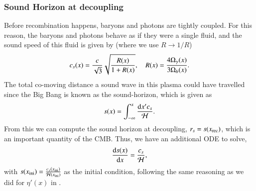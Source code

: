 \subsubsection{Sound Horizon at decoupling} \label{sssec:M2:sound_horizon}
Before recombination happens, baryons and photons are tightly coupled. For this reason, the baryons and photons behave as if they were a single fluid, and the sound speed of this fluid is given by \cite[Eq. (9.21)]{Dodelson} (where we use $R\to 1/R$)
\begin{equation} \label{eq:M2:theory:soundspeed_R_baryons_and_photons}
    c_s(x) = \frac{c}{\sqrt{3}} \sqrt{\frac{R(x)}{1+R(x)}},\quad R(x) = \frac{4\Omega_{\gamma}(x)}{3\Omega_b(x)}.
\end{equation}
The total co-moving distance a sound wave in this plasma could have travelled since the Big Bang is known as the sound-horizon, which is given as 
\begin{equation} \label{eq:M2:theory:sound_horizon_integral}
    s(x)=\int_{-\infty}^x \frac{\dd x' c_s}{\mathcal{H}}.
\end{equation}
From this we can compute the sound horizon at decoupling, $r_s = s(x_\mathrm{rec})$, which is an important quantity of the CMB. Thus, we have an additional ODE to solve, 
\begin{equation} \label{eq:M2:theory:sound_horizon_ODE}
    \dv{s(x)}{x} = \frac{c_s}{\mathcal{H}},
\end{equation}
with $s(x_\mathrm{ini})=\frac{c_s(x_\mathrm{ini})}{\mathcal{H}(x_\mathrm{ini})}$ as the initial condition, following the same reasoning as we did for $\eta'(x)$ in .
